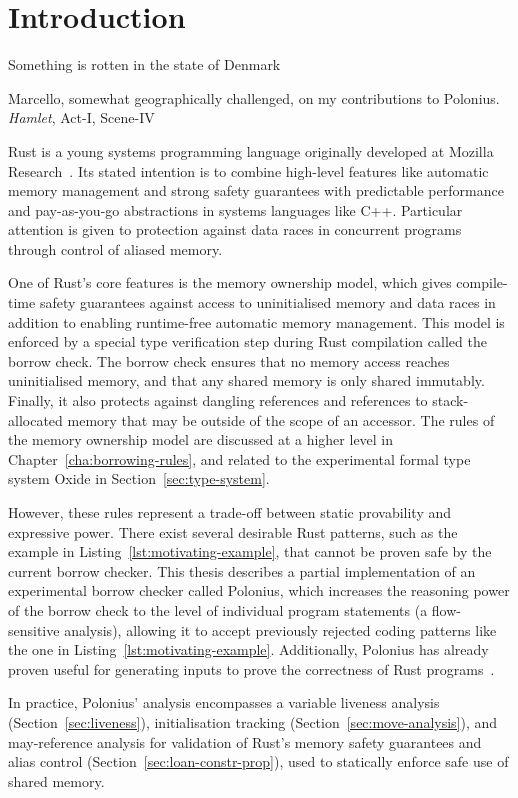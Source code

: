 \documentclass[11pt,a4paper,twoside,openany,draft]{report}
\begin{document}
\chapter{Introduction}
\epigraph{Something is rotten in the state of Denmark}%
{Marcello, somewhat geographically challenged, on my contributions to Polonius.
  \textit{Hamlet}, Act-I, Scene-IV}
Rust is a young systems programming language originally developed at Mozilla
Research~\cite{matsakis_rust_2014}. Its stated intention is to combine
high-level features like automatic memory management and strong safety
guarantees with predictable performance and pay-as-you-go abstractions in
systems languages like C++. Particular attention is given to protection against
data races in concurrent programs through control of aliased memory.

One of Rust's core features is the memory ownership model, which gives
compile-time safety guarantees against access to uninitialised memory and data
races in addition to enabling runtime-free automatic memory management. This
model is enforced by a special type verification step during Rust compilation
called the borrow check. The borrow check ensures that no memory access reaches
uninitialised memory, and that any shared memory is only shared immutably.
Finally, it also protects against dangling references and references to
stack-allocated memory that may be outside of the scope of an accessor. The
rules of the memory ownership model are discussed at a higher level in
Chapter~\ref{cha:borrowing-rules}, and related to the experimental formal type
system Oxide in Section~\ref{sec:type-system}.

However, these rules represent a trade-off between static provability and
expressive power. There exist several desirable Rust patterns, such as the
example in Listing~\ref{lst:motivating-example}, that cannot be proven safe by
the current borrow checker. This thesis describes a partial implementation of an
experimental borrow checker called Polonius, which increases the reasoning power
of the borrow check to the level of individual program statements (a
flow-sensitive analysis), allowing it to accept previously rejected coding
patterns like the one in Listing~\ref{lst:motivating-example}. Additionally,
Polonius has already proven useful for generating inputs to prove the
correctness of Rust programs~\cite{Astrauskas:2019:LRT:3366395.3360573}.

In practice, Polonius' analysis encompasses a variable liveness analysis
(Section~\ref{sec:liveness}), initialisation tracking
(Section~\ref{sec:move-analysis}), and may-reference analysis for validation
of Rust's memory safety guarantees and alias control
(Section~\ref{sec:loan-constr-prop}), used to statically enforce safe use of
shared memory.
\end{document}
